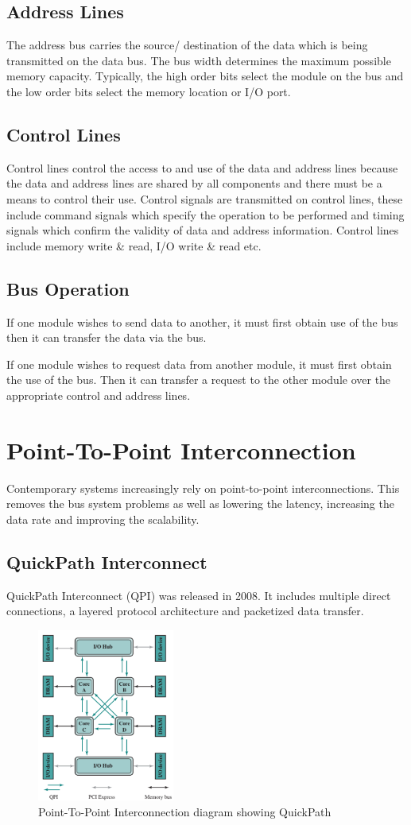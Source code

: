 \subsection{Address Lines}
The address bus carries the source/ destination of the data which is being transmitted on the data bus. The bus width determines the maximum possible memory capacity. Typically, the high order bits select the module on the bus and the low order bits select the memory location or I/O port.

\subsection{Control Lines}
Control lines control the access to and use of the data and address lines because the data and address lines are shared by all components and there must be a means to control their use. Control signals are transmitted on control lines, these include command signals which specify the operation to be performed and timing signals which confirm the validity of data and address information. Control lines include memory write \& read, I/O write \& read etc.

\subsection{Bus Operation}
If one module wishes to send data to another, it must first obtain use of the bus then it can transfer the data via the bus.

If one module wishes to request data from another module, it must first obtain the use of the bus. Then it can transfer a request to the other module over the appropriate control and address lines. 

\section{Point-To-Point Interconnection}
Contemporary systems increasingly rely on point-to-point interconnections. This removes the bus system problems as well as lowering the latency, increasing the data rate and improving the scalability.
\subsection{QuickPath Interconnect}
QuickPath Interconnect (QPI) was released in 2008. It includes multiple direct connections, a layered protocol architecture and packetized data transfer.

\begin{figure}[H]
    \centering
    \includegraphics[width=0.4\textwidth]{assets/qpi.png} 
    \caption*{Point-To-Point Interconnection diagram showing QuickPath}
\end{figure}